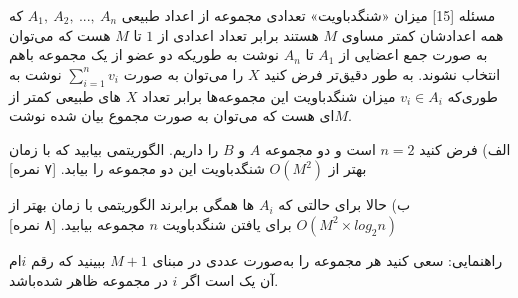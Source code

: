 ‌مسئله [15]
میزان «شنگدباویت» تعدادی مجموعه از اعداد طبیعی 
$A_1, \ A_2, \ ..., \ A_n$
که همه‌ اعدادشان کمتر مساوی $M$ هستند برابر تعداد اعدادی از $1$ تا $M$ هست که می‌توان به صورت جمع اعضایی از $A_1$ تا $A_n$ نوشت به طوریکه دو عضو از یک مجموعه باهم انتخاب نشوند.
به طور دقیق‌تر فرض کنید $X$ را می‌توان به صورت $\sum_{i=1}^{n}  v_i$ نوشت به طوری‌که $v_i \in A_i$ میزان شنگدباویت این مجموعه‌ها برابر تعداد $X$ های طبیعی کمتر از $M$ای هست که می‌توان به صورت مجموع بیان شده نوشت.

الف) فرض کنید $n = 2$ است و دو مجموعه $A$ و $B$ را داریم. الگوریتمی بیابید که با زمان بهتر از $O(M^2)$ شنگدباویت این دو مجموعه را بیابد. [۷ نمره]

ب) حالا برای حالتی که $A_i$ ها همگی برابرند الگوریتمی با زمان بهتر از $O(M^2\times log_2n)$ برای یافتن شنگدباویت $n$ مجموعه بیابید. [۸ نمره]

راهنمایی: سعی کنید هر مجموعه را به‌صورت عددی در مبنای $M + 1$ ببینید که رقم $i$ام آن یک است اگر $i$ در مجموعه ظاهر شده‌باشد.
\\
\\



% 
%
%
% 



